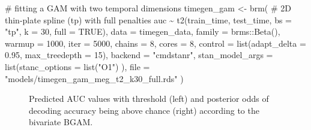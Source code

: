 \documentclass[
  doc,
  floatsintext,
  longtable,
  a4paper,
  nolmodern,
  notxfonts,
  notimes,
  colorlinks=true,linkcolor=blue,citecolor=blue,urlcolor=blue]{apa7}
\newenvironment{Shaded}{\begin{snugshade}}{\end{snugshade}}
\newcommand{\AttributeTok}[1]{\textcolor[rgb]{0.40,0.45,0.13}{#1}}
\newcommand{\CommentTok}[1]{\textcolor[rgb]{0.37,0.37,0.37}{#1}}
\newcommand{\ConstantTok}[1]{\textcolor[rgb]{0.56,0.35,0.01}{#1}}
\newcommand{\DecValTok}[1]{\textcolor[rgb]{0.68,0.00,0.00}{#1}}
\newcommand{\FloatTok}[1]{\textcolor[rgb]{0.68,0.00,0.00}{#1}}
\newcommand{\FunctionTok}[1]{\textcolor[rgb]{0.28,0.35,0.67}{#1}}
\newcommand{\NormalTok}[1]{\textcolor[rgb]{0.00,0.23,0.31}{#1}}
\newcommand{\OtherTok}[1]{\textcolor[rgb]{0.00,0.23,0.31}{#1}}
\newcommand{\SpecialCharTok}[1]{\textcolor[rgb]{0.37,0.37,0.37}{#1}}
\newcommand{\StringTok}[1]{\textcolor[rgb]{0.13,0.47,0.30}{#1}}
\begin{document}
\begin{Shaded}
\begin{Highlighting}[]
\CommentTok{\# fitting a GAM with two temporal dimensions}
\NormalTok{timegen\_gam }\OtherTok{\textless{}{-}} \FunctionTok{brm}\NormalTok{(}
    \CommentTok{\# 2D thin{-}plate spline (tp) with full penalties}
\NormalTok{    auc }\SpecialCharTok{\textasciitilde{}} \FunctionTok{t2}\NormalTok{(train\_time, test\_time, }\AttributeTok{bs =} \StringTok{"tp"}\NormalTok{, }\AttributeTok{k =} \DecValTok{30}\NormalTok{, }\AttributeTok{full =} \ConstantTok{TRUE}\NormalTok{),}
    \AttributeTok{data =}\NormalTok{ timegen\_data,}
    \AttributeTok{family =}\NormalTok{ brms}\SpecialCharTok{::}\FunctionTok{Beta}\NormalTok{(),}
    \AttributeTok{warmup =} \DecValTok{1000}\NormalTok{,}
    \AttributeTok{iter =} \DecValTok{5000}\NormalTok{,}
    \AttributeTok{chains =} \DecValTok{8}\NormalTok{,}
    \AttributeTok{cores =} \DecValTok{8}\NormalTok{,}
    \AttributeTok{control =} \FunctionTok{list}\NormalTok{(}\AttributeTok{adapt\_delta =} \FloatTok{0.95}\NormalTok{, }\AttributeTok{max\_treedepth =} \DecValTok{15}\NormalTok{),}
    \AttributeTok{backend =} \StringTok{"cmdstanr"}\NormalTok{,}
    \AttributeTok{stan\_model\_args =} \FunctionTok{list}\NormalTok{(}\AttributeTok{stanc\_options =} \FunctionTok{list}\NormalTok{(}\StringTok{"O1"}\NormalTok{) ),}
    \AttributeTok{file =} \StringTok{"models/timegen\_gam\_meg\_t2\_k30\_full.rds"}
\NormalTok{    )}
\end{Highlighting}
\end{Shaded}

\begin{figure}[!htb]

\caption{\label{fig-gam-timegen-post-preds}Predicted AUC values with
threshold (left) and posterior odds of decoding accuracy being above
chance (right) according to the bivariate BGAM.}


\end{figure}%
\end{document}
